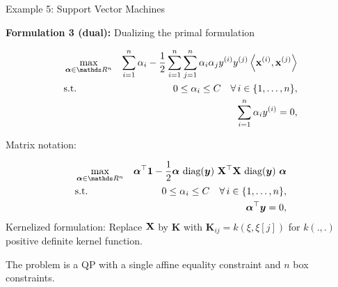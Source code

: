 %		
%		
%		


\begin{frame}{Example 5: Support Vector Machines}

\textbf{Formulation 3 (dual): } Dualizing the primal formulation 

\vspace*{-0.5cm}

\begin{footnotesize}
\begin{eqnarray*}
	& \max\limits_{\alphav \in \R^n} & \sum_{i=1}^n \alpha_i - \frac{1}{2}\sum_{i=1}^n\sum_{j=1}^n\alpha_i\alpha_j\yi y^{(j)} \scp{\xi}{\xv^{(j)}} \\
	& \text{s.t. } & 0 \le \alpha_i \le C \quad \forall\, i \in \nset, \\
	& \quad & \sum_{i=1}^n \alpha_i \yi = 0,
\end{eqnarray*}
\end{footnotesize}

\vspace*{-0.5cm}

Matrix notation: 

\vspace*{-0.5cm}

\begin{footnotesize}
\begin{eqnarray*}
	& \max\limits_{\alphav \in \R^n} & \bm{\alpha}^\top \bm{1} - \frac{1}{2} \bm{\alpha} ~ \text{diag}(\bm{y}) ~ \Xmat^\top \Xmat ~ \text{diag}(\bm{y})~\bm{\alpha} \\
	& \text{s.t. } & 0 \le \alpha_i \le C \quad \forall\, i \in \nset, \\
	& \quad & \bm{\alpha}^\top \bm{y} = 0,
\end{eqnarray*}
Kernelized formulation: Replace $\mathbf{X}$ by $\bm{K}$ with $\bm{K}_{ij} = k(\xi, \xi[j])$ for $k(.,.)$ positive definite kernel function. 
\end{footnotesize}

\vspace*{0.2cm}

The problem is a QP with a single affine equality constraint and $n$ box constraints. 

\end{frame}

